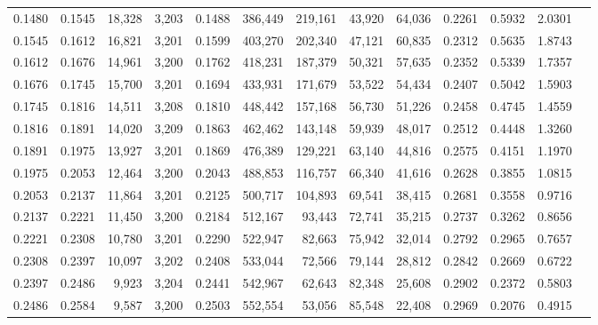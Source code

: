 \begin{tabular}{rrrrrrrrrrrrr}
0.1480 & 0.1545 & 18,328 & 3,203 &                                     0.1488 & 386,449 & 219,161 &  43,920 &  64,036 & 0.2261 & 0.5932 & 2.0301 \\
0.1545 & 0.1612 & 16,821 & 3,201 &                                     0.1599 & 403,270 & 202,340 &  47,121 &  60,835 & 0.2312 & 0.5635 & 1.8743 \\
0.1612 & 0.1676 & 14,961 & 3,200 &                                     0.1762 & 418,231 & 187,379 &  50,321 &  57,635 & 0.2352 & 0.5339 & 1.7357 \\
0.1676 & 0.1745 & 15,700 & 3,201 &                                     0.1694 & 433,931 & 171,679 &  53,522 &  54,434 & 0.2407 & 0.5042 & 1.5903 \\
0.1745 & 0.1816 & 14,511 & 3,208 &                                     0.1810 & 448,442 & 157,168 &  56,730 &  51,226 & 0.2458 & 0.4745 & 1.4559 \\
0.1816 & 0.1891 & 14,020 & 3,209 &                                     0.1863 & 462,462 & 143,148 &  59,939 &  48,017 & 0.2512 & 0.4448 & 1.3260 \\
0.1891 & 0.1975 & 13,927 & 3,201 &                                     0.1869 & 476,389 & 129,221 &  63,140 &  44,816 & 0.2575 & 0.4151 & 1.1970 \\
0.1975 & 0.2053 & 12,464 & 3,200 &                                     0.2043 & 488,853 & 116,757 &  66,340 &  41,616 & 0.2628 & 0.3855 & 1.0815 \\
0.2053 & 0.2137 & 11,864 & 3,201 &                                     0.2125 & 500,717 & 104,893 &  69,541 &  38,415 & 0.2681 & 0.3558 & 0.9716 \\
0.2137 & 0.2221 & 11,450 & 3,200 &                                     0.2184 & 512,167 &  93,443 &  72,741 &  35,215 & 0.2737 & 0.3262 & 0.8656 \\
0.2221 & 0.2308 & 10,780 & 3,201 &                                     0.2290 & 522,947 &  82,663 &  75,942 &  32,014 & 0.2792 & 0.2965 & 0.7657 \\
0.2308 & 0.2397 & 10,097 & 3,202 &                                     0.2408 & 533,044 &  72,566 &  79,144 &  28,812 & 0.2842 & 0.2669 & 0.6722 \\
0.2397 & 0.2486 &  9,923 & 3,204 &                                     0.2441 & 542,967 &  62,643 &  82,348 &  25,608 & 0.2902 & 0.2372 & 0.5803 \\
0.2486 & 0.2584 &  9,587 & 3,200 &                                     0.2503 & 552,554 &  53,056 &  85,548 &  22,408 & 0.2969 & 0.2076 & 0.4915 \\

\end{tabular}
